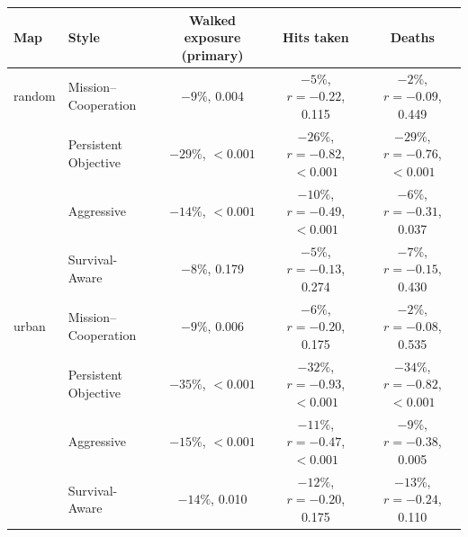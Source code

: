 \begin{tabular}{llccc}
\toprule
Map & Style & Walked exposure (primary) & Hits taken & Deaths \\
\midrule
random & Mission--Cooperation & $-9\%$, 0.004 & $-5\%$, $r=-0.22$, 0.115 & $-2\%$, $r=-0.09$, 0.449 \\
 & Persistent Objective & $-29\%$, $<0.001$ & $-26\%$, $r=-0.82$, $<0.001$ & $-29\%$, $r=-0.76$, $<0.001$ \\
 & Aggressive & $-14\%$, $<0.001$ & $-10\%$, $r=-0.49$, $<0.001$ & $-6\%$, $r=-0.31$, 0.037 \\
 & Survival-Aware & $-8\%$, 0.179 & $-5\%$, $r=-0.13$, 0.274 & $-7\%$, $r=-0.15$, 0.430 \\
\midrule
urban & Mission--Cooperation & $-9\%$, 0.006 & $-6\%$, $r=-0.20$, 0.175 & $-2\%$, $r=-0.08$, 0.535 \\
 & Persistent Objective & $-35\%$, $<0.001$ & $-32\%$, $r=-0.93$, $<0.001$ & $-34\%$, $r=-0.82$, $<0.001$ \\
 & Aggressive & $-15\%$, $<0.001$ & $-11\%$, $r=-0.47$, $<0.001$ & $-9\%$, $r=-0.38$, 0.005 \\
 & Survival-Aware & $-14\%$, 0.010 & $-12\%$, $r=-0.20$, 0.175 & $-13\%$, $r=-0.24$, 0.110 \\
\bottomrule
\end{tabular}
